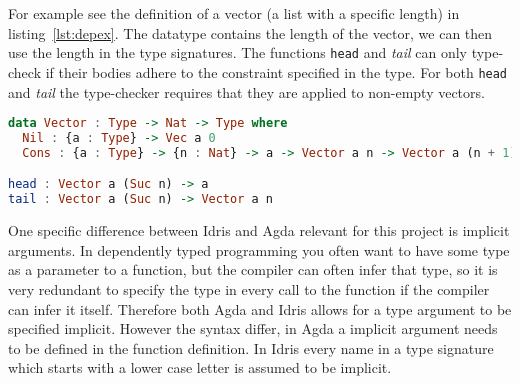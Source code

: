 \documentclass[parskip=half]{scrartcl}
\begin{document}
For example see the definition of a vector (a list with a specific length) in
listing~\ref{lst:depex}. The datatype contains the length of the vector, we can
then use the length in the type signatures.
The functions \texttt{head} and \textit{tail} can only type-check if their
bodies adhere to the constraint specified in the type.
For both \texttt{head} and \textit{tail} the type-checker requires that they
are applied to non-empty vectors.



\begin{lstlisting}[language=Haskell,label={lst:depex},caption={Definition of
a vector type in Idris, the type signatures of \textit{head} and \textit{tail}. \textit{n} is a type parameter, in this case it is a natural number.  }]
data Vector : Type -> Nat -> Type where
  Nil : {a : Type} -> Vec a 0
  Cons : {a : Type} -> {n : Nat} -> a -> Vector a n -> Vector a (n + 1)

head : Vector a (Suc n) -> a
tail : Vector a (Suc n) -> Vector a n
\end{lstlisting}




%

One specific difference between Idris and Agda relevant for this project is
implicit arguments. In dependently typed programming you often want to have
some type as a parameter to a function, but the compiler can often infer that
type, so it is very redundant to specify the type in every call to the function
if the compiler can infer it itself. Therefore both Agda and Idris allows for
a type argument to be specified implicit. However the syntax differ, in Agda
a implicit argument needs to be defined in the function definition. In Idris
every name in a type signature which starts with a lower case letter is assumed
to be implicit.
\end{document}

